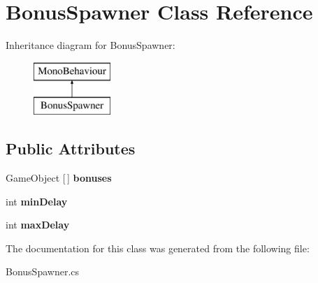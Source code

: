 \hypertarget{class_bonus_spawner}{}\section{Bonus\+Spawner Class Reference}
\label{class_bonus_spawner}
Inheritance diagram for Bonus\+Spawner\+:\begin{figure}[H]
\begin{center}
\leavevmode
\includegraphics[height=2.000000cm]{class_bonus_spawner}
\end{center}
\end{figure}
\subsection*{Public Attributes}
\begin{DoxyCompactItemize}
\item 
\mbox{\label{class_bonus_spawner_ad25c4d6982ce6c6320e82575edae417d}} 
Game\+Object \mbox{[}$\,$\mbox{]} {\bfseries bonuses}
\item 
\mbox{\label{class_bonus_spawner_a175114204cf7db8557af8018b04f7283}} 
int {\bfseries min\+Delay}
\item 
\mbox{\label{class_bonus_spawner_aa0aecdf16c51c0dcf62dd4e573f742be}} 
int {\bfseries max\+Delay}
\end{DoxyCompactItemize}


The documentation for this class was generated from the following file\+:\begin{DoxyCompactItemize}
\item 
Bonus\+Spawner.\+cs\end{DoxyCompactItemize}
